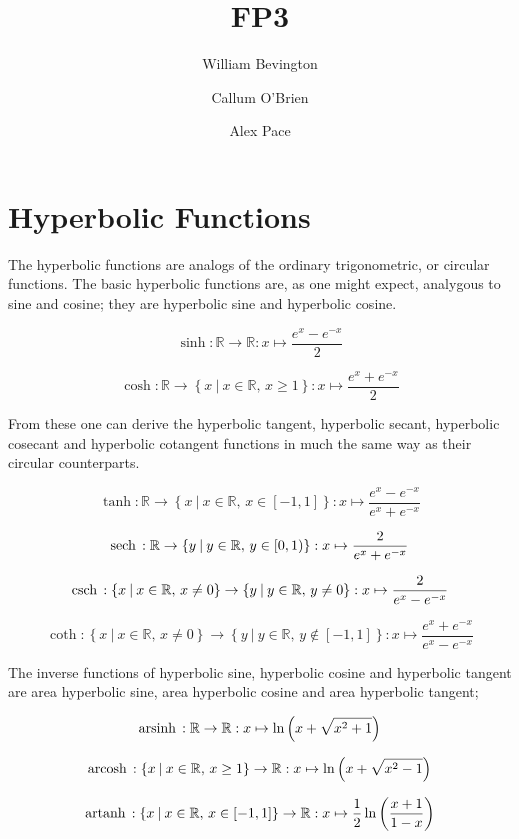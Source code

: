 \documentclass{article}
\title{FP3}
\author{William Bevington \and Callum O'Brien \and Alex Pace}
\newcommand{\st}{\:|\:}
\newcommand{\csch}{\textrm{csch\,}}
\newcommand{\sech}{\textrm{sech\,}}
\newcommand{\arsinh}{\textrm{arsinh\,}}
\newcommand{\arcosh}{\textrm{arcosh\,}}
\newcommand{\artanh}{\textrm{artanh\,}}
\begin{document}
\maketitle
\tableofcontents
\newpage

\section{Hyperbolic Functions}

The hyperbolic functions are analogs of the ordinary trigonometric, or circular functions. The basic hyperbolic functions are, as one might expect, analygous to sine and cosine; they are hyperbolic sine and hyperbolic cosine.

\[\sinh : \mathbb{R} \rightarrow \mathbb{R} : x \mapsto \frac{e^x - e^{-x}}{2}\]

\[\cosh : \mathbb{R} \rightarrow \left\{x \st x \in \mathbb{R},\, x \geq 1\right\} : x \mapsto \frac{e^x + e^{-x}}{2}\]

\noindent From these one can derive the hyperbolic tangent, hyperbolic secant, hyperbolic cosecant and hyperbolic cotangent functions in much the same way as their circular counterparts.

\[\tanh : \mathbb{R} \rightarrow \left\{x \st x \in \mathbb{R},\, x \in \left[-1, 1\right]\right\} : x \mapsto \frac{e^x - e^{-x}}{e^x + e^{-x}}\]

\[\sech : \mathbb{R} \rightarrow \left\{y \st y \in \mathbb{R},\, y \in \left[0,1\right)\right\} : x \mapsto \frac{2}{e^x + e^{-x}}\]

\[\csch : \left\{x \st x \in \mathbb{R},\, x \neq 0 \right\} \rightarrow \left\{y \st y \in \mathbb{R},\, y \neq 0\right\} : x \mapsto \frac{2}{e^x - e^{-x}}\]

\[\coth : \left\{x \st x \in \mathbb{R},\, x \neq 0 \right\} \rightarrow \left\{y \st y \in \mathbb{R},\, y \notin \left[-1, 1\right]\right\} : x \mapsto \frac{e^x + e^{-x}}{e^x - e^{-x}}\]

\noindent The inverse functions of hyperbolic sine, hyperbolic cosine and hyperbolic tangent are area hyperbolic sine, area hyperbolic cosine and area hyperbolic tangent;

\[\arsinh : \mathbb{R} \rightarrow \mathbb{R} : x \mapsto \ln\left(x + \sqrt{x^2 + 1}\right)\]

\[\arcosh : \left\{x \st x \in \mathbb{R},\, x \geq 1 \right\} \rightarrow \mathbb{R} : x \mapsto \ln\left(x + \sqrt{x^2 - 1}\right)\]

\[\artanh : \left\{x \st x \in \mathbb{R},\, x \in \left[-1, 1\right]\right\} \rightarrow \mathbb{R} : x \mapsto \frac{1}{2}\ln\left(\frac{x + 1}{1 - x}\right)\]
\end{document}

